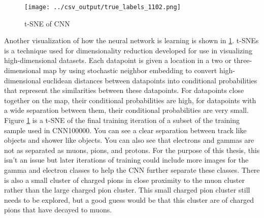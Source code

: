 \begin{figure}[htp!]
\centering
\texttt{[image: ../csv\_output/true\_labels\_1102.png]}
\caption{t-SNE of CNN}
\label{fig:tsne}
\end{figure}
Another visualization of how the neural network is learning is shown in \ref{fig:tsne}.  t-SNEs \cite{tsne} is a technique used for dimensionality reduction developed for use in visualizing high-dimensional datasets. Each datapoint is given a location in a two or three-dimensional map by using stochastic neighbor embedding to convert high-dimensional euclidean distances between datapoints into conditional probabilities that represent the similarities between these datapoints. For datapoints close together on the map, their conditional probabilities are high, for datapoints with a wide separation between them, their conditional probabilities are very small. Figure \ref{fig:tsne} is a t-SNE of the final training iteration of a subset of the training sample used in CNN100000. You can see a clear separation between track like objects and shower like objects. You can also see that electrons and gammas are not as separated as muons, pions, and protons. For the purpose of this thesis, this isn't an issue but later iterations of training could include more images for the gamma and electron classes to help the CNN further separate these classes. There is also a small cluster of charged pions in close proximity to the muon cluster rather than the large charged pion cluster. This small charged pion cluster still needs to be explored, but a good guess would be that this cluster are of charged pions that have decayed to muons.


